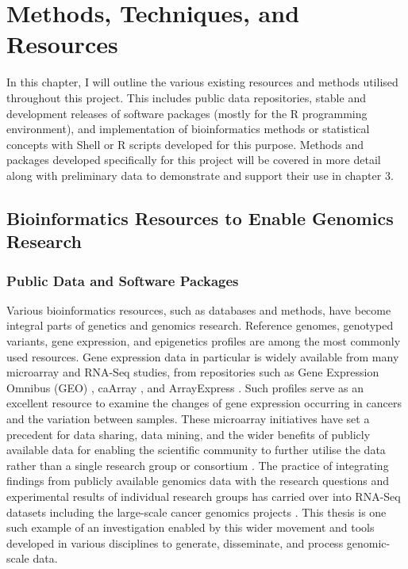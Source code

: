 \chapter{Methods, Techniques, and Resources}
\label{chap:methods}

In this chapter, I will outline the various existing resources and methods utilised throughout this project. This includes public data repositories, stable and development releases of software packages (mostly for the R programming environment), and implementation of bioinformatics methods or statistical concepts with Shell or R scripts developed for this purpose. Methods and packages developed specifically for this project will be covered in more detail along with preliminary data to demonstrate and support their use in chapter 3. 

\section{Bioinformatics Resources to Enable Genomics Research}
\subsection{Public Data and Software Packages}
Various bioinformatics resources, such as databases and methods, have become integral parts of genetics and genomics research. Reference genomes, genotyped variants, gene expression, and epigenetics profiles are among the most commonly used resources. Gene expression data in particular is widely available from many microarray and RNA-Seq studies, from repositories such as Gene Expression Omnibus (GEO) \citep{GEO2016}, caArray \citep{caArray2014}, and ArrayExpress \citep{ArrayExpress2013}. Such profiles serve as an excellent resource to examine the changes of gene expression occurring in cancers and the variation between samples. These microarray initiatives have set a precedent for data sharing, data mining, and the wider benefits of publicly available data for enabling the scientific community to further utilise the data rather than a single research group or consortium \citep{Rung2013}. The practice of integrating findings from publicly available genomics data with the research questions and experimental results of individual research groups has carried over into RNA-Seq datasets including the large-scale cancer genomics projects \citep{ICGC2011}. This thesis is one such example of an investigation enabled by this wider movement and tools developed in various disciplines to generate, disseminate, and process genomic-scale data.
 

